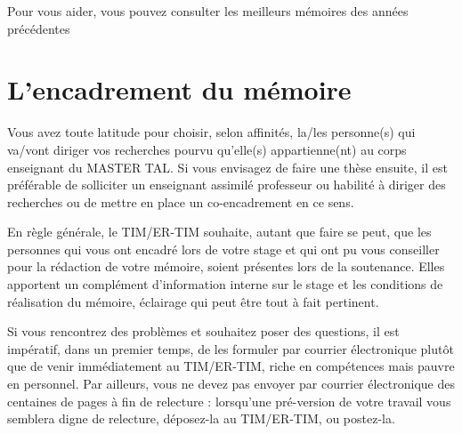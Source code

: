 Pour vous aider, vous pouvez consulter les meilleurs mémoires des années précédentes %


\section{L'encadrement du mémoire}
Vous avez toute latitude pour choisir, selon affinités, la/les personne(s) qui va/vont diriger vos recherches pourvu qu'elle(s) appartienne(nt) au corps enseignant du MASTER TAL.
Si vous envisagez de faire une thèse ensuite, il est préférable de solliciter un enseignant assimilé professeur ou habilité à diriger des recherches ou de mettre en place un co-encadrement en ce sens.

En règle générale, le TIM/ER-TIM souhaite, autant que faire se peut, que les personnes qui vous ont encadré lors de votre stage et qui ont pu vous conseiller pour la rédaction de votre mémoire, soient présentes lors de la soutenance. Elles apportent un complément d'information interne sur le stage et les conditions de réalisation du mémoire, éclairage qui peut être tout à fait pertinent.

Si vous rencontrez des problèmes et souhaitez poser des questions, il est impératif, dans un premier temps, de les formuler par courrier électronique plutôt que de venir immédiatement au TIM/ER-TIM, riche en compétences mais pauvre en personnel. Par ailleurs, vous ne devez pas envoyer par courrier électronique des centaines de pages à fin de relecture : lorsqu'une pré-version de votre travail vous semblera digne de relecture, déposez-la au TIM/ER-TIM, ou postez-la.


